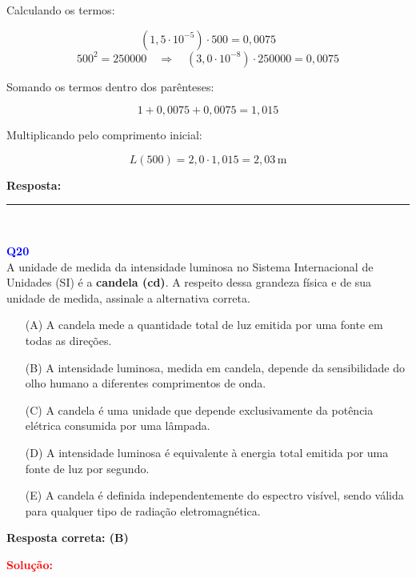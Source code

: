 \documentclass[a4paper,12pt]{article}
\begin{document}
\begin{flushleft}
Calculando os termos:

\[
(1{,}5 \cdot 10^{-5}) \cdot 500 = 0{,}0075
\]
\[
500^2 = 250000 \quad \Rightarrow \quad (3{,}0 \cdot 10^{-8}) \cdot 250000 = 0{,}0075
\]

Somando os termos dentro dos parênteses:

\[
1 + 0{,}0075 + 0{,}0075 = 1{,}015
\]

Multiplicando pelo comprimento inicial:

\[
L(500) = 2{,}0 \cdot 1{,}015 = 2{,}03\,\text{m}
\]

\textbf{Resposta:}  \quad {}

\end{flushleft}

\noindent\rule{\linewidth}{0.6pt}\\

\begin{flushleft}
\textbf{\textcolor{blue}{\Large Q20}}\\

A unidade de medida da \colorbox{red!20}{intensidade luminosa no Sistema Internacional de Unidades} \colorbox{red!20}{(SI) é a \textbf{candela (cd)}}. A respeito 
dessa grandeza física e de sua unidade de medida, assinale a alternativa correta.

\begin{enumerate}
    \item[(A)] A candela mede a quantidade total de luz emitida por uma fonte em todas as direções.
    
    \item[\colorbox{green!50}{(B)}] A intensidade luminosa, medida em candela, depende da sensibilidade do olho humano a diferentes comprimentos de onda.
    
    \item[(C)] A candela é uma unidade que depende exclusivamente da potência elétrica consumida por uma lâmpada.
    
    \item[(D)] A intensidade luminosa é equivalente à energia total emitida por uma fonte de luz por segundo.
    
    \item[(E)] A candela é definida independentemente do espectro visível, sendo válida para qualquer tipo de radiação eletromagnética.
\end{enumerate}

\textbf{Resposta correta: \colorbox{green!50}{(B)}}

\vspace{0.5cm}

\textcolor{red}{\textbf{Solução:}}\\

\end{flushleft}
\end{document}
